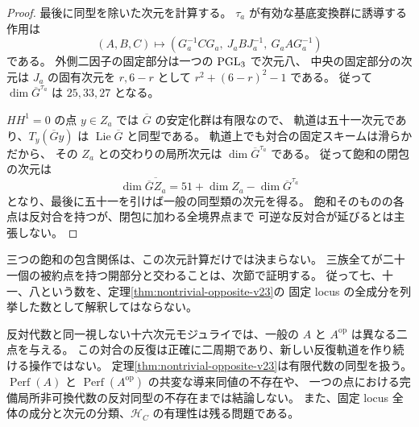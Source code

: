 \begin{proof}
最後に同型を除いた次元を計算する。
$\tau_a$ が有効な基底変換群に誘導する作用は
\[
 (A,B,C)\longmapsto
 (G_a^{-1}CG_a,\ J_aBJ_a^{-1},\ G_aAG_a^{-1})
\]
である。
外側二因子の固定部分は一つの $\operatorname{PGL}_3$ で次元八、
中央の固定部分の次元は $J_a$ の固有次元を $r,6-r$ として
$r^2+(6-r)^2-1$ である。
従って $\dim\overline G^{\tau_a}$ は $25,33,27$ となる。

$HH^1=0$ の点 $y\in Z_a$ では $\overline G$ の安定化群は有限なので、
軌道は五十一次元であり、$T_y(\overline G y)$ は $\operatorname{Lie}\overline G$ と同型である。
軌道上でも対合の固定スキームは滑らかだから、
その $Z_a$ との交わりの局所次元は $\dim\overline G^{\tau_a}$ である。
従って飽和の閉包の次元は
\[
 \dim\overline{\overline G Z_a}
 =51+\dim Z_a-\dim\overline G^{\tau_a}
\]
となり、最後に五十一を引けば一般の同型類の次元を得る。
飽和そのものの各点は反対合を持つが、閉包に加わる全境界点まで
可逆な反対合が延びるとは主張しない。
\end{proof}

三つの飽和の包含関係は、この次元計算だけでは決まらない。
三族全てが二十一個の被約点を持つ開部分と交わることは、次節で証明する。
従って七、十一、八という数を、定理\ref{thm:nontrivial-opposite-v23}の
固定 locus の全成分を列挙した数として解釈してはならない。

\begin{remark}[結論の範囲]
反対代数と同一視しない十六次元モジュライでは、一般の $A$ と $A^{\mathrm{op}}$ は異なる二点を与える。
この対合の反復は正確に二周期であり、新しい反復軌道を作り続ける操作ではない。
定理\ref{thm:nontrivial-opposite-v23}は有限代数の同型を扱う。
$\operatorname{Perf}(A)$ と $\operatorname{Perf}(A^{\mathrm{op}})$ の共変な導来同値の不存在や、
一つの点における完備局所非可換代数の反対同型の不存在までは結論しない。
また、固定 locus 全体の成分と次元の分類、$\mathcal H_C$ の有理性は残る問題である。
\end{remark}






